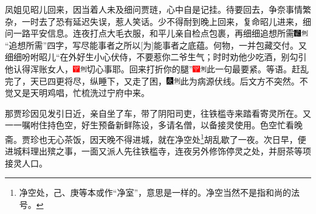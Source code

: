 凤姐见昭儿回来，因当着人未及细问贾琏，心中自是记挂。待要回去，争奈事情繁杂，一时去了恐有延迟失误，惹人笑话。少不得耐到晚上回来，复命昭儿进来，细问一路平安信息。连夜打点大毛衣服，和平儿亲自检点包裹，再细细追想所需{\includegraphics[width=3mm]{../Images/00006}\includegraphics[width=3mm]{../Images/00011}\footnotesize \kaishu “追想所需”四字，写尽能事者之所以{[}为{]}能事者之底蕴。}何物，一并包藏交付。又细细吩咐昭儿“在外好生小心伏侍，不要惹你二爷生气；时时劝他少吃酒，别勾引他认得浑账女人，{\includegraphics[width=3mm]{../Images/00002}\includegraphics[width=3mm]{../Images/00011}\footnotesize \kaishu 切心事耶。}回来打折你的腿”{\includegraphics[width=3mm]{../Images/00002}\includegraphics[width=3mm]{../Images/00011}\footnotesize \kaishu 此一句最要紧。}等语。赶乱完了，天已四更将尽，纵睡下，又走了困，{\includegraphics[width=3mm]{../Images/00004}\includegraphics[width=3mm]{../Images/00011}\footnotesize \kaishu 此为病源伏线。后文方不突然。}不觉又是天明鸡唱，忙梳洗过宁府中来。

那贾珍因见发引日近，亲自坐了车，带了阴阳司吏，往铁槛寺来踏看寄灵所在。又一一嘱咐住持色空，好生预备新鲜陈设，多请名僧，以备接灵使用。色空忙看晚斋。贾珍也无心茶饭，因天晚不得进城，就在净空处\footnote{净空处，己、庚等本或作“净室”，意思是一样的。净空当然不是指和尚的法号。}胡乱歇了一夜。次日早，便进城料理出殡之事，一面又派人先往铁槛寺，连夜另外修饰停灵之处，并厨茶等项接灵人口。

